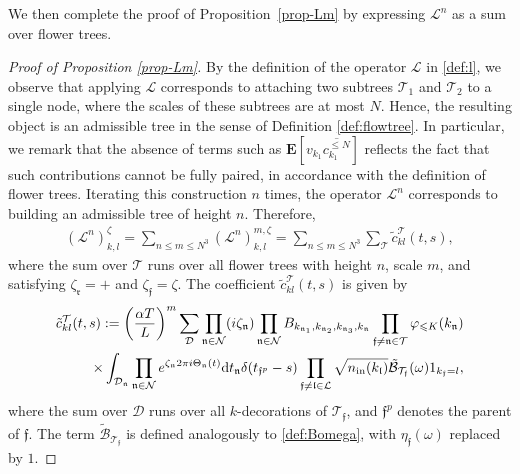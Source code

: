 \documentclass[UTF-8,reqno]{amsart}
\numberwithin{equation}{section}
\theoremstyle{definition}
\def\dif{{\mathord{{\rm d}}}}
\def\leq{\leqslant}
\def\dif{{\mathord{{\rm d}}}}
\def\leq{\leqslant}
\begin{document}
We then complete the proof of Proposition~\ref{prop-Lm} by expressing $\mathscr{L}^n$ as a sum over flower trees.
\begin{proof}[Proof of Proposition \ref{prop-Lm}]
  By the definition of the operator $\mathscr{L}$ in \eqref{def:l}, we observe that applying $\mathscr{L}$ corresponds to attaching two subtrees $\mathcal{T}_1$ and $\mathcal{T}_2$ to a single node, where the scales of these subtrees are at most $N$. Hence, the resulting object is an admissible tree in the sense of Definition \ref{def:flowtree}.   In particular, we remark that the absence of terms such as $\mathbf{E}[v_{k_1}\overline {c_{k_1}^{\leq N}}]$ reflects the fact that such contributions cannot be fully paired, in accordance with the definition of flower trees.  
Iterating this construction $n$ times, the operator $\mathscr{L}^n$ corresponds to building an admissible tree of height $n$. Therefore,
    \begin{align*}
        (\mathscr L^{n})^\zeta_{k, l} = \sum_{n \leq m \leq N^3} (\mathscr 
L^{n})_{k, l}^{m, \zeta}=\sum_{n \leq m \leq N^3} \sum_{\mathcal{T}}\tilde{c}_{kl}^{\mathcal{T}}(t,s), 
\end{align*}
where the sum over $\mathcal{T}$ runs over all flower trees with height $n$, scale $m$, and satisfying $\zeta_{\mathfrak{r}}=+$ and $\zeta_{\mathfrak{f}}=\zeta$.  The coefficient $\tilde{c}_{kl}^{\mathcal{T}}(t,s)$ is given by
\begin{align}
    \tilde{c}_{kl}^{\mathcal{T}}(t,s):=\bigg(\frac{\alpha T}{L}\bigg)^m\sum_{\mathcal{D}}\prod_{\mathfrak{n}\in\mathcal{N}}(i\zeta_{\mathfrak{n}}%
    )\prod_{\mathfrak{n}\in\mathcal{N}}B_{k_{\mathfrak{n}_1},k_{\mathfrak{n}_2},k_{\mathfrak{n}_3},k_{\mathfrak{n}}}\prod_{\mathfrak{f}\neq \mathfrak{n}\in\mathcal{T}}\varphi_{\leq K}(k_\mathfrak{n})\notag\\
    \times \int_{\mathcal{D}_\mathfrak{n}}\prod_{\mathfrak{n}\in\mathcal{N}}  e^{\zeta_\mathfrak{n}2\pi i \Theta_\mathfrak{n}(t) } \dif t_\mathfrak{n} \delta({t_{\mathfrak{f}^p}-s)}\prod_{\mathfrak{f}\neq \mathfrak{l}\in\mathcal{L}}\sqrt{n_{\mathrm{in}}(k_{\mathfrak{l}})}\tilde{\mathcal{B}}_{\mathcal{T}_\mathfrak{f}}(\omega)1_{k_\mathfrak{f}=l},\label{def:tildect}
\end{align}
where the sum over $\mathcal{D}$ runs over all $k$-decorations of $\mathcal{T}_{\mathfrak{f}}$, and $\mathfrak{f}^p$ denotes the parent of $\mathfrak{f}$. The term $\tilde{\mathcal{B}}_{\mathcal{T}_\mathfrak{f}}$ is defined analogously to \eqref{def:Bomega}, with $\eta_{\mathfrak{f}}(\omega)$ replaced by $1$.  


\end{proof}
\end{document}
